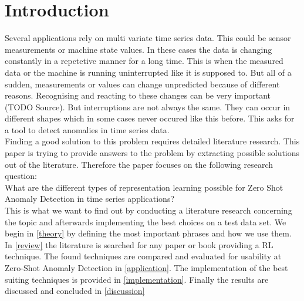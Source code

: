 \section{Introduction}\label{intro}
Several applications rely on multi variate time series data. This could be sensor measurements or machine state values. In these cases the data is changing constantly in a repetetive manner for a long time. This is when the measured data or the machine is running uninterrupted like it is supposed to. But all of a sudden, measurements or values can change unpredicted because of different reasons. Recognising and reacting to these changes can be very important (TODO Source). But interruptions are not always the same. They can occur in different shapes which in some cases never occured like this before. This asks for a tool to detect anomalies in time series data.\\
Finding a good solution to this problem requires detailed literature research. This paper is trying to provide answers to the problem by extracting possible solutions out of the literature. Therefore the paper focuses on the following research question:\\
What are the different types of representation learning possible for Zero Shot Anomaly Detection in time series applications?\\
This is what we want to find out by conducting a literature research concerning the topic and afterwards implementing the best choices on a test data set. We begin in \ref{theory} by defining the most important phrases and how we use them. In \ref{review} the literature is searched for any paper or book providing a RL technique. The found techniques are compared and evaluated for usability at Zero-Shot Anomaly Detection in \ref{application}. The implementation of the best suiting techniques is provided in \ref{implementation}. Finally the results are discussed and concluded in \ref{discussion}
